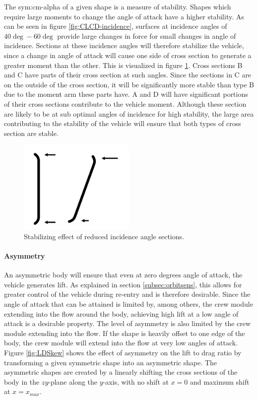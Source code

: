 The \gls{sym:cm-alpha} of a given shape is a measure of stability. Shapes which require large moments to change the angle of attack have a higher stability. As can be seen in figure \ref{fig:CLCD-incidence}, surfaces at incidence angles of $40\deg-60\deg$ provide large changes in force for small changes in angle of incidence. Sections at these incidence angles will therefore stabilize the vehicle, since a change in angle of attack will cause one side of cross section to generate a greater moment than the other. This is visualized in figure \ref{fig:StabMom}. Cross sections B and C have parts of their cross section at such angles. Since the sections in C are on the outside of the cross section, it will be significantly more stable than type B due to the moment arm these parts have. A and D will have significant portions of their cross sections contribute to the vehicle moment. Although these section are likely to be at sub optimal angles of incidence for high stability, the large area contributing to the stability of the vehicle will ensure that both types of cross section are stable. 

\begin{figure} 
	\centering
	\includegraphics[width=0.5\textwidth]{./Figure/Aerodynamics/StabilizeMoment.pdf}
	\caption{Stabilizing effect of reduced incidence angle sections. }
	\label{fig:StabMom}
\end{figure}

\paragraph{Asymmetry}
An asymmetric body will ensure that even at zero degrees angle of attack, the vehicle generates lift. As explained in section \ref{subsec:orbitsens}, this allows for greater control of the vehicle during re-entry and is therefore desirable. Since the angle of attack that can be attained is limited by, among others, the crew module extending into the flow around the body, achieving high lift at a low angle of attack is a desirable property. The level of asymmetry is also limited by the crew module extending into the flow. If the shape is heavily offset to one edge of the body, the crew module will extend into the flow at very low angles of attack. Figure \ref{fig:LDSkew} shows the effect of asymmetry on the lift to drag ratio by transforming a given symmetric shape into an asymmetric shape. The asymmetric shapes are created by a linearly shifting the cross sections of the body in the $zy$-plane along the $y$-axis, with no shift at $x=0$ and maximum shift at $x=x_{max}$. 


